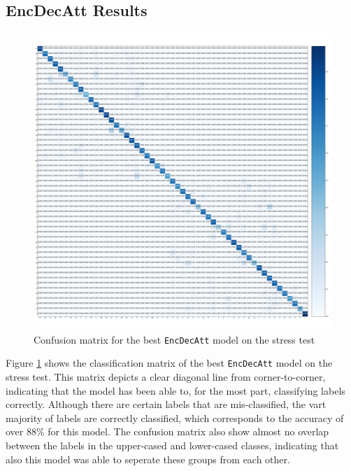\subsection{EncDecAtt Results}
\begin{figure}[H]
    \centering
    \includegraphics[width=1\textwidth]{fig/results/experiment4/encdecatt/confusion_matrix.png}
    \caption{Confusion matrix for the best {\tt EncDecAtt} model on the stress test}
    \label{fig:result4_encdecatt_confusion_matrix}
\end{figure}

Figure \ref{fig:result4_encdecatt_confusion_matrix} shows the classification matrix of the best {\tt EncDecAtt} model on the stress test. This matrix depicts a clear diagonal line from corner-to-corner, indicating that the model has been able to, for the most part, classifying labels correctly. Although there are certain labels that are mis-classified, the vart majority of labels are correctly classified, which corresponds to the accuracy of over 88\% for this model. The confusion matrix also show almost no overlap between the labels in the upper-cased and lower-cased classes, indicating that also this model was able to seperate these groups from each other. 


